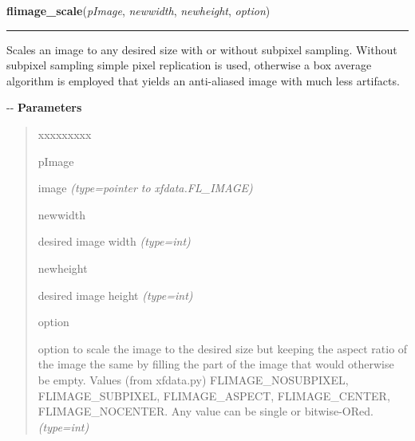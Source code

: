     \label{xformslib:flflimage:flimage_scale}

    \vspace{0.5ex}

\hspace{.8\funcindent}\begin{boxedminipage}{\funcwidth}

    \raggedright \textbf{flimage\_scale}(\textit{pImage}, \textit{newwidth}, \textit{newheight}, \textit{option})

    \vspace{-1.5ex}

    \rule{\textwidth}{0.5\fboxrule}
\setlength{\parskip}{2ex}

Scales an image to any desired size with or without subpixel sampling.
Without subpixel sampling simple pixel replication is used, otherwise a
box average algorithm is employed that yields an anti-aliased image with
much less artifacts.

-{}-
\setlength{\parskip}{1ex}
      \textbf{Parameters}
      \vspace{-1ex}

      \begin{quote}
        \begin{Ventry}{xxxxxxxxx}

          \item[pImage]


image
            {\it (type=pointer to xfdata.FL\_IMAGE)}

          \item[newwidth]


desired image width
            {\it (type=int)}

          \item[newheight]


desired image height
            {\it (type=int)}

          \item[option]


option to scale the image to the desired size but keeping the aspect
ratio of the image the same by filling the part of the image that
would otherwise be empty. Values (from xfdata.py) FLIMAGE\_NOSUBPIXEL,
FLIMAGE\_SUBPIXEL, FLIMAGE\_ASPECT, FLIMAGE\_CENTER, FLIMAGE\_NOCENTER.
Any value can be single or bitwise-ORed.
            {\it (type=int)}

        \end{Ventry}


\end{quote}
\end{boxedminipage}
